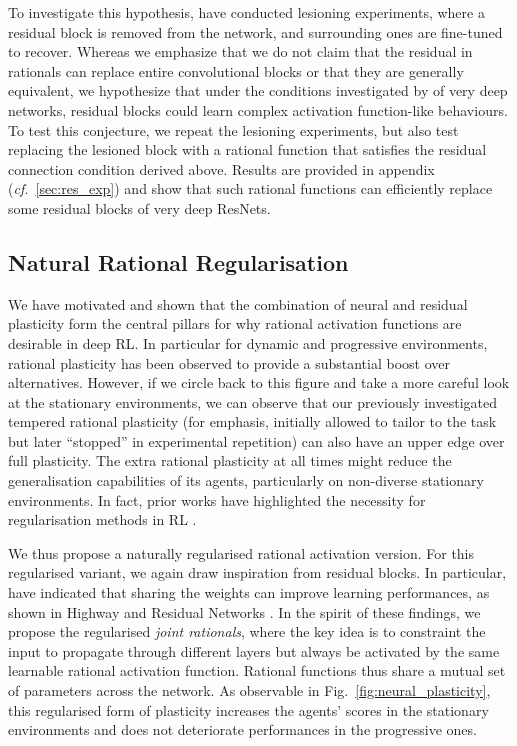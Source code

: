 \documentclass[accepted]{article}
\theoremstyle{plain}
\theoremstyle{definition}
\theoremstyle{remark}
\newcommand{\cf}{\emph{cf.}~}
\begin{document}
To investigate this hypothesis, \citeauthor{VeitWB16} have conducted lesioning experiments, where a residual block is removed from the network, and surrounding ones are fine-tuned to recover. Whereas we emphasize that we do not claim that the residual in rationals can replace entire convolutional blocks or that they are generally equivalent, we hypothesize that under the conditions investigated by \citeauthor{VeitWB16} of very deep networks, residual blocks could learn complex activation function-like behaviours. To test this conjecture, we repeat the lesioning experiments, but also test replacing the lesioned block with a rational function that satisfies the residual connection condition derived above. Results are provided in appendix (\cf \ref{sec:res_exp}) and show that such rational functions can efficiently replace some residual blocks of very deep ResNets. 

\subsection{Natural Rational Regularisation} 
We have motivated and shown that the combination of neural and residual plasticity form the central pillars for why rational activation functions are desirable in deep RL. In particular for dynamic and progressive environments, rational plasticity has been observed to provide a substantial boost over alternatives. However, if we circle back to this figure and take a more careful look at the stationary environments, we can observe that our previously investigated tempered rational plasticity (for emphasis, initially allowed to tailor to the task but later ``stopped'' in experimental repetition) can also have an upper edge over full plasticity. The extra rational plasticity at all times might reduce the generalisation capabilities of its agents, particularly on non-diverse stationary environments. In fact, prior works have highlighted the necessity for regularisation methods in RL \citep{farebrother2018regdqn, RoyBHNP20regul, YaratsKF21Image}. 

We thus propose a naturally regularised rational activation version. For this regularised variant, we again draw inspiration from residual blocks. In particular, \citeauthor{greff2016highway} have indicated that sharing the weights can improve learning performances, as shown in Highway \citep{lu2016small} and Residual Networks \citep{liao2016bridging}. In the spirit of these findings, we propose the regularised \textit{joint rationals}, where the key idea is to constraint the input to propagate through different layers but always be activated by the same learnable rational activation function. Rational functions thus share a mutual set of parameters across the network. 
As observable in Fig.~\ref{fig:neural_plasticity}, this regularised form of plasticity increases the agents' scores in the stationary environments and does not deteriorate performances in the progressive ones.
\end{document}
